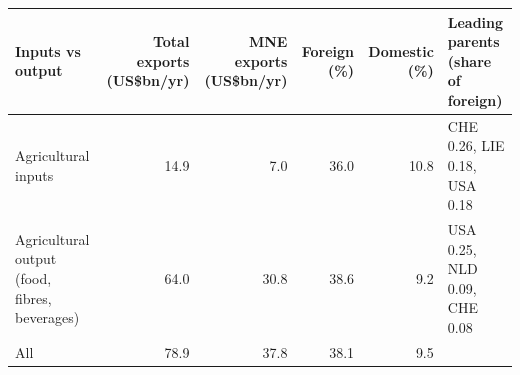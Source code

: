\begin{tabular}{@{}l r r r r l@{}}
\toprule
Inputs vs output & Total exports (US\$bn/yr) & MNE exports (US\$bn/yr) & Foreign (\%) & Domestic (\%) & Leading parents (share of foreign) \\
\midrule
Agricultural inputs & 14.9 & 7.0 & 36.0 & 10.8 & CHE 0.26, LIE 0.18, USA 0.18 \\
Agricultural output (food, fibres, beverages) & 64.0 & 30.8 & 38.6 & 9.2 & USA 0.25, NLD 0.09, CHE 0.08 \\
\midrule
All & 78.9 & 37.8 & 38.1 & 9.5 & \\
\bottomrule
\end{tabular}
